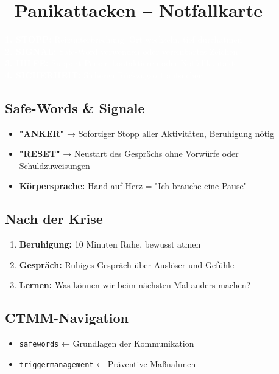 
\section*{\textcolor{ctmmRed}{\faExclamationTriangle~Panikattacken -- Notfallkarte}}

\begin{ctmmRedBox}[title=\textcolor{white}{\textbf{SOFORTMASSNAHMEN}}]
\textcolor{white}{\textbf{1. STOPP:}} \textcolor{white}{Reizunterbrechung, Ort wechseln, tief durchatmen}\\
\textcolor{white}{\textbf{2. SIGNAL:}} \textcolor{white}{Safe-Word verwenden oder vereinbartes Zeichen}\\
\textcolor{white}{\textbf{3. HILFE:}} \textcolor{white}{Support-Person kontaktieren oder Notfallkontakt}\\
\textcolor{white}{\textbf{4. SICHERHEIT:}} \textcolor{white}{Sicheren Rückzugsort aufsuchen}
\end{ctmmRedBox}

\subsection*{\textcolor{ctmmOrange}{Safe-Words & Signale}}
\begin{ctmmOrangeBox}[title=Notfall-Kommunikation]
\begin{itemize}
  \item \textbf{"ANKER"} → Sofortiger Stopp aller Aktivitäten, Beruhigung nötig
  \item \textbf{"RESET"} → Neustart des Gesprächs ohne Vorwürfe oder Schuldzuweisungen
  \item \textbf{Körpersprache:} Hand auf Herz = "Ich brauche eine Pause"
\end{itemize}
\end{ctmmOrangeBox}

\subsection*{\textcolor{ctmmGreen}{Nach der Krise}}
\begin{ctmmGreenBox}[title=Nachsorge & Reflexion]
\begin{enumerate}
  \item \textbf{Beruhigung:} 10 Minuten Ruhe, bewusst atmen
  \item \textbf{Gespräch:} Ruhiges Gespräch über Auslöser und Gefühle
  \item \textbf{Lernen:} Was können wir beim nächsten Mal anders machen?
\end{enumerate}
\end{ctmmGreenBox}

\subsection*{\textcolor{ctmmBlue}{CTMM-Navigation}}
\begin{itemize}
  \item \texttt{safewords} ← Grundlagen der Kommunikation
  \item \texttt{triggermanagement} ← Präventive Maßnahmen
\end{itemize}